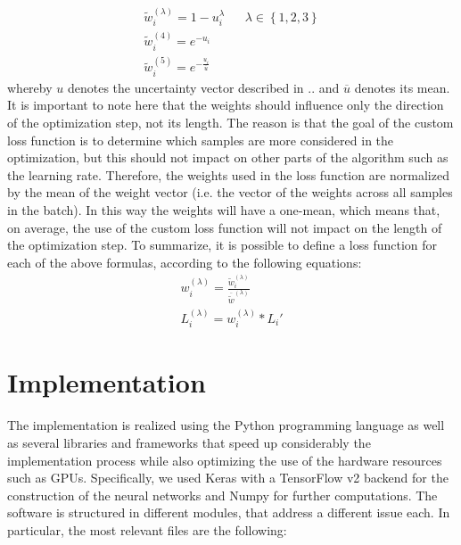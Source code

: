 \documentclass[11pt,twoside,a4paper]{article}
\begin{document}
\begin{equation*}
\begin{aligned}
\widetilde{w}_{i}^{(\lambda )} = 1-u_{i}^{\lambda} && \textstyle \lambda \in \left \{ 1, 2, 3 \right \} \\
\widetilde{w}_{i}^{(4)} = e^{-u_{i}} \\
\widetilde{w}_{i}^{(5)} = e^{-\frac{u_{i}}{\overline{u}}}
\end{aligned}
\end{equation*}
whereby \({u}\) denotes the uncertainty vector described in .. and \(\overline{u}\) denotes its mean.\newline
It is important to note here that the weights should influence only the direction of the optimization step, not its length. The reason is that the goal of the custom loss function is to determine which samples are more considered in the optimization, but this should not impact on other parts of the algorithm such as the learning rate. Therefore, the weights used in the loss function are normalized by the mean of the weight vector (i.e. the vector of the weights across all samples in the batch). In this way the weights will have a one-mean, which means that, on average, the use of the custom loss function will not impact on the length of the optimization step.\newline
To summarize, it is possible to define a loss function for each of the above formulas, according to the following equations:
\begin{align}
w_{i}^{(\lambda )} = \frac{\widetilde{w}_{i}^{(\lambda )}}{\overline{\widetilde{w}}^{(\lambda)}} \\
L_{i}^{(\lambda)} = w_{i}^{(\lambda)} * {L_{i}}'
\end{align}


\section{Implementation}
\label{sec:implementation}
The implementation is realized using the Python programming language as well as several libraries and frameworks that speed up considerably the implementation process while also optimizing the use of the hardware resources such as GPUs. Specifically, we used Keras with a TensorFlow v2 backend for the construction of the neural networks and Numpy for further computations.\newline
The software is structured in different modules, that address a different issue each. In particular, the most relevant files are the following:
\end{document}
